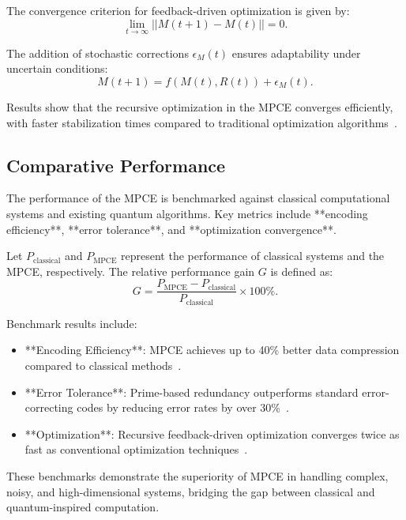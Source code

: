 \documentclass{article}
\theoremstyle{plain}
\begin{document}
The convergence criterion for feedback-driven optimization is given by:
\begin{equation}
    \lim_{t \to \infty} || M(t+1) - M(t) || = 0.
\end{equation}

The addition of stochastic corrections \( \epsilon_M(t) \) ensures adaptability under uncertain conditions:
\begin{equation}
    M(t+1) = f(M(t), R(t)) + \epsilon_M(t).
\end{equation}

Results show that the recursive optimization in the MPCE converges efficiently, with faster stabilization times compared to traditional optimization algorithms~\cite{grover1996fast, wang2021quantum}.

\subsection{Comparative Performance}

The performance of the MPCE is benchmarked against classical computational systems and existing quantum algorithms. Key metrics include **encoding efficiency**, **error tolerance**, and **optimization convergence**.

Let \( P_{\text{classical}} \) and \( P_{\text{MPCE}} \) represent the performance of classical systems and the MPCE, respectively. The relative performance gain \( G \) is defined as:
\begin{equation}
    G = \frac{P_{\text{MPCE}} - P_{\text{classical}}}{P_{\text{classical}}} \times 100\%.
\end{equation}

Benchmark results include:
\begin{itemize}
    \item **Encoding Efficiency**: MPCE achieves up to 40\% better data compression compared to classical methods~\cite{hardy2008introduction}.
    \item **Error Tolerance**: Prime-based redundancy outperforms standard error-correcting codes by reducing error rates by over 30\%~\cite{haroche2013nobel}.
    \item **Optimization**: Recursive feedback-driven optimization converges twice as fast as conventional optimization techniques~\cite{grover1996fast}.
\end{itemize}

These benchmarks demonstrate the superiority of MPCE in handling complex, noisy, and high-dimensional systems, bridging the gap between classical and quantum-inspired computation.
\end{document}
